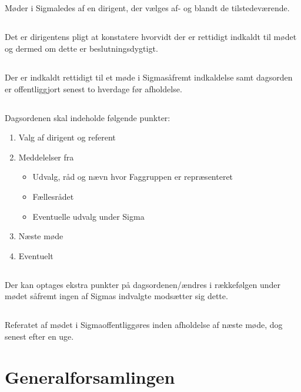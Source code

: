 \documentclass[danish,a4paper,twocolumn]{article}
\newcommand{\foreningen}{Sigma}
\begin{document}
\subsection{}Møder i \foreningen ledes af en dirigent, der vælges af- og blandt de tilstedeværende.
\subsection{}Det er dirigentens pligt at konstatere hvorvidt der er rettidigt indkaldt til mødet og dermed om dette er beslutningsdygtigt.
\subsection{}Der er indkaldt rettidigt til et møde i \foreningen såfremt indkaldelse samt dagsorden er offentliggjort senest to hverdage før afholdelse.
\subsection{}Dagsordenen skal indeholde følgende punkter:
\begin{enumerate}
        \item Valg af dirigent og referent
        \item Meddelelser fra
        \begin{itemize}
                \item Udvalg, råd og nævn hvor Faggruppen er repræsenteret
                \item Fællesrådet
                \item Eventuelle udvalg under \foreningen
        \end{itemize}
        \item Næste møde
        \item Eventuelt
\end{enumerate}
\subsection{}Der kan optages ekstra punkter på dagsordenen/ændres i rækkefølgen under mødet såfremt ingen af \foreningen s indvalgte modsætter sig dette.
\subsection{}Referatet af mødet i \foreningen offentliggøres inden afholdelse af næste møde, dog senest efter en uge.
 
\section{Generalforsamlingen}\label{par:GF}
\end{document}
